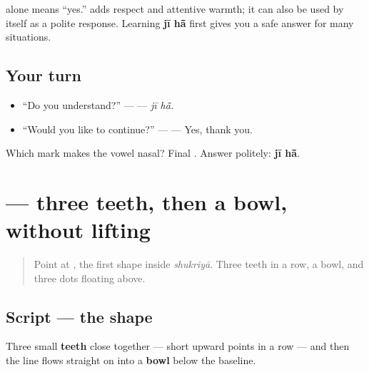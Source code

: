 \begin{grammarlens}[title={Grammar Lens: respect inside “yes”}]
\textbf{} alone means “yes.” \textbf{} adds respect and attentive warmth; it can also be used by itself as a polite response. Learning \textbf{jī hā̃} first gives you a safe answer for many situations.
\end{grammarlens}

\subsection*{Your turn}
\begin{itemize}
\raggedright
  \item “Do you understand?” — \textbf{ } — \emph{jī hā̃.}
  \item “Would you like to continue?” — \textbf{  } — Yes, thank you.
\end{itemize}

\begin{tcolorbox}[breakable,colback=teal!4,colframe=teal!35!black,title={Before you move on}]
Which mark makes the vowel nasal? Final \textbf{}. Answer politely: \textbf{jī hā̃}.
\end{tcolorbox}
\section[\texorpdfstring{\ur{س} (sīn)}{س (sīn)}]{ — three teeth, then a bowl, without lifting}

\label{lesson:UR-W01-sin}



\begin{quote}
Point at \textbf{}, the first shape inside \emph{shukriyā}. Three teeth in a row, a bowl, and three dots floating above.
\end{quote}

\subsection*{Script — the shape}

\begin{quote}
\end{quote}

Three small \textbf{teeth} close together — short upward points in a row — and then the line flows straight on into a \textbf{bowl} below the baseline.

